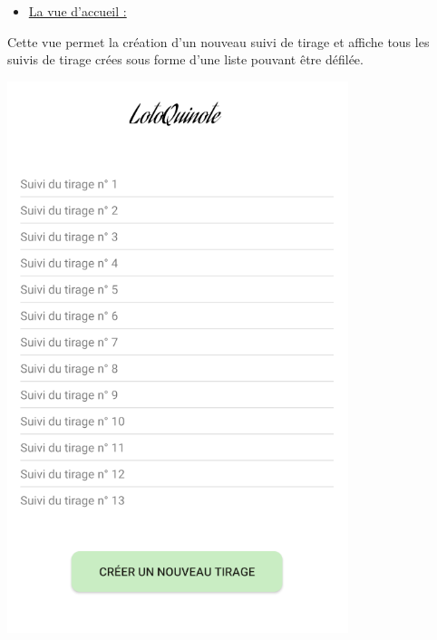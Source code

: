 \documentclass{article}
\begin{document}
\begin{itemize}
\vspace{1em}
    \item {\underline {\large{La vue d'accueil :}}}
\end{itemize} 
    \noindent%
    \begin{minipage}{.6\textwidth}%
    Cette vue permet la création d'un nouveau suivi de tirage et affiche tous les suivis de tirage crées sous forme d'une liste pouvant être défilée. 
    \end{minipage}%
    \hfill
    \begin{minipage}{.35\textwidth}%
        \includegraphics[scale=0.7]{accueil.png}
    \end{minipage}%
    
\end{document}
